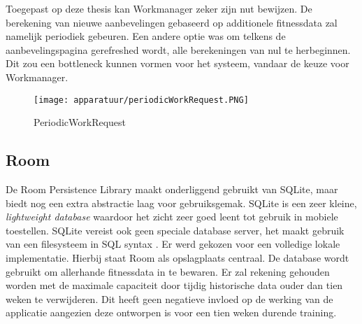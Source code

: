 Toegepast op deze thesis kan Workmanager zeker zijn nut bewijzen. De berekening van nieuwe aanbevelingen gebaseerd op additionele fitnessdata zal namelijk periodiek gebeuren. Een andere optie was om telkens de aanbevelingspagina gerefreshed wordt, alle berekeningen van nul te herbeginnen. Dit zou een bottleneck kunnen vormen voor het systeem, vandaar de keuze voor Workmanager.

\begin{figure}
\centering
\caption{PeriodicWorkRequest \cite{ref65}}\label{fig:periodicwork}
\texttt{[image: apparatuur/periodicWorkRequest.PNG]}
\end{figure} 

\subsection{Room}

De Room Persistence Library maakt onderliggend gebruikt van SQLite, maar biedt nog een extra abstractie laag voor gebruiksgemak. SQLite is een zeer kleine, \textit{lightweight database} waardoor het zicht zeer goed leent tot gebruik in mobiele toestellen. SQLite vereist ook geen speciale database server, het maakt gebruik van een filesysteem in SQL syntax \cite{ref66} \cite{ref67}.
Er werd gekozen voor een volledige lokale implementatie. Hierbij staat Room als opslagplaats centraal. De database wordt gebruikt om allerhande fitnessdata in te bewaren. Er zal rekening gehouden worden met de maximale capaciteit door tijdig historische data ouder dan tien weken te verwijderen. Dit heeft geen negatieve invloed op de werking van de applicatie aangezien deze ontworpen is voor een tien weken durende training.
